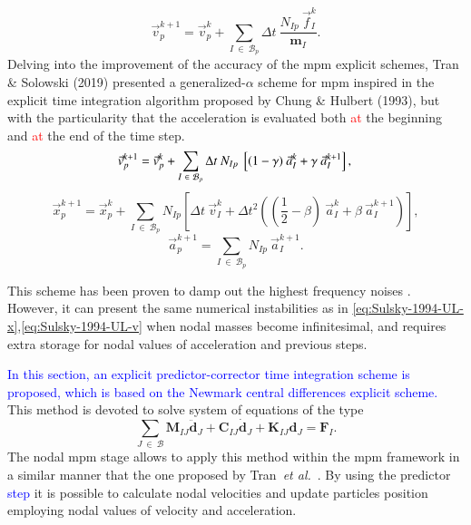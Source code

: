 \documentclass[preprint,12pt,a4paper]{elsarticle}
\newcommand{\tens}[1]{
  \ensuremath{\mathbf{{#1}}}
}
\newcommand{\Matrix}[1]{
  \ensuremath{\mathbf{{#1}}}
}
\newcommand{\Vector}[1]{
  \ensuremath{\mathbf{{#1}}}
}
\begin{document}
\begin{equation}
  \label{eq:Zhang-2016-UL-v}
  \vec{v}_p^{k+1} = \vec{v}_p^{k} + \sum_{I\ \in\ \mathcal{B}_p} \Delta t\ \frac{N_{Ip}\ \vec{f}_{I}^{k}}{\tens{m}_I}.
\end{equation}
Delving into the improvement of the accuracy of the \acrshort{mpm} explicit schemes, Tran \& Solowski (2019)\cite{Tran2019e} presented a
generalized-$\alpha$ scheme for \acrshort{mpm} inspired in the explicit time
integration algorithm proposed by Chung \& Hulbert
(1993)\cite{Geranlized_alpha_1993}, but with the particularity that
the acceleration is evaluated both \textcolor{red}{at} the beginning and \textcolor{red}{at} the end of the time step.
\begin{equation}
  \label{eq:Tran-2019-GA-v}
  \vec{v}_p^{k+1} = \vec{v}_p^{k} + \sum_{I\ \in\ \mathcal{B}_p} \Delta t\  N_{Ip}\ \left[(1 - \gamma)\ \vec{a}_I^{k} +
    \gamma\ \vec{a}_I^{k+1} \right],\\
\end{equation}
\begin{equation}
\label{eq:Tran-2019-GA-x}
  \vec{x}_p^{k+1} = \vec{x}_p^{k} + \sum_{I\ \in\ \mathcal{B}_p} N_{Ip} \left[ \Delta t\ \vec{v}_{I}^{k}+ \Delta t^2\left( (\frac{1}{2} - \beta)\
    \vec{a}_{I}^{k} + \beta\ \vec{a}_{I}^{k+1} \right) \right],
\end{equation}
\begin{equation}
  \label{eq:Tran-2019-GA-a}
  \vec{a}_p^{k+1} = \sum_{I\ \in\ \mathcal{B}_p} N_{Ip}\ \vec{a}_{I}^{k+1}.
\end{equation}

This scheme has been proven to damp out the highest frequency noises
\cite{Tran2019e}. However, it can present the same numerical instabilities
as in \eqref{eq:Sulsky-1994-UL-x},\eqref{eq:Sulsky-1994-UL-v} when
nodal masses become infinitesimal, and requires extra storage for
nodal values of acceleration and previous steps.

\textcolor{blue}{In this section, an explicit predictor-corrector time integration
scheme is proposed, which is based on the Newmark central differences explicit scheme.} This method is devoted to solve  system of equations of the type
{\color{red}
\begin{equation*}
 \sum_{J\ \in\ \mathcal{B}} \Matrix{M}_{IJ}\ddot{\Vector{d}}_{J} + \Matrix{C}_{IJ}\dot{\Vector{d}}_{J} +
  \Matrix{K}_{IJ}\Vector{d}_{J} = \Vector{F}_{I}.
\end{equation*}
}
The nodal \acrshort{mpm} stage allows to apply this method
within the \acrshort{mpm} framework in a similar manner that the one
proposed by Tran~\textit{et al.}~\cite{Tran2019e}. By using the predictor \textcolor{blue}{step}  it is possible to calculate nodal velocities and update particles position employing nodal values
of velocity and acceleration. 
\end{document}
